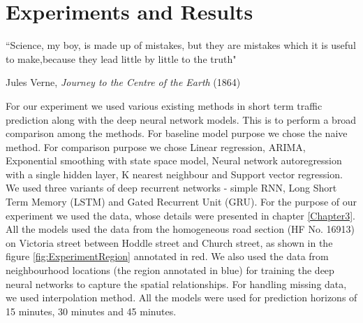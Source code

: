 
\chapter{Experiments and Results} %

\label{Chapter5} %


``Science, my boy, is made up of mistakes, but they are mistakes which it is useful to make,because
they lead little by little to the truth"

\begin{flushright}
Jules Verne, \textit{Journey to the Centre of the Earth} (1864)
\end{flushright}


For our experiment we used various existing methods in short term traffic prediction along with the
deep neural network models. This is to perform a broad comparison among the methods. For
baseline model purpose we chose the naive method. For comparison purpose we chose Linear regression, ARIMA,
Exponential smoothing with state space model, Neural network autoregression with a single hidden layer, K nearest
neighbour and Support vector regression. We used three variants of deep recurrent networks - simple
RNN, Long Short Term Memory (LSTM) and Gated Recurrent Unit (GRU). For the purpose of our experiment we used the data, whose
details were presented in chapter \ref{Chapter3}. All the models used the data from the homogeneous road
section (HF No. 16913) on Victoria street between Hoddle street and Church street, as shown in the
figure \ref{fig:ExperimentRegion} annotated in red. We also used the data from neighbourhood locations
(the region annotated in blue) for training the deep neural networks to capture the spatial relationships.
For handling missing data, we used interpolation method. All the models were used for prediction
horizons of 15 minutes, 30 minutes and 45 minutes.


